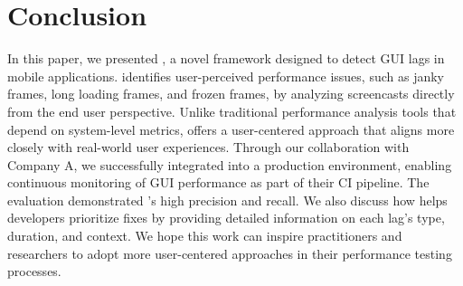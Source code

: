 \section{Conclusion}
\label{sec:conclusion}


In this paper, we presented \tool, a novel framework designed to detect GUI lags in mobile applications. \tool identifies user-perceived performance issues, such as janky frames, long loading frames, and frozen frames, by analyzing screencasts directly from the end user perspective. Unlike traditional performance analysis tools that depend on system-level metrics, \tool offers a user-centered approach that aligns more closely with real-world user experiences. 
Through our collaboration with Company A, we successfully integrated \tool into a production environment, enabling continuous monitoring of GUI performance as part of their CI pipeline. The evaluation demonstrated \tool's high precision and recall. We also discuss how \tool helps developers prioritize fixes by providing detailed information on each lag's type, duration, and context.  
We hope this work can inspire practitioners and researchers to adopt more user-centered approaches in their performance testing processes. 


